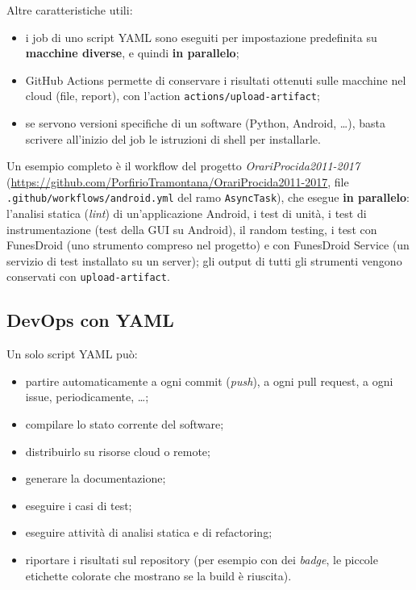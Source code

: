 Altre caratteristiche utili:

\begin{itemize}
  \item i job di uno script YAML sono eseguiti per impostazione predefinita su \textbf{macchine diverse}, e quindi
        \textbf{in parallelo};
  \item GitHub Actions permette di conservare i risultati ottenuti sulle macchine nel cloud (file, report), con
        l'action \texttt{actions/upload-artifact};
  \item se servono versioni specifiche di un software (Python, Android, \ldots), basta scrivere all'inizio del job le
        istruzioni di shell per installarle.
\end{itemize}

Un esempio completo è il workflow del progetto \textit{OrariProcida2011-2017}
(\url{https://github.com/PorfirioTramontana/OrariProcida2011-2017}, file
\texttt{.github/workflows/android.yml} del ramo \texttt{AsyncTask}), che esegue \textbf{in parallelo}: l'analisi
statica (\textit{lint}) di un'applicazione Android, i test di unità, i test di instrumentazione (test della GUI su
Android), il random testing, i test con FunesDroid (uno strumento compreso nel progetto) e con FunesDroid Service (un
servizio di test installato su un server); gli output di tutti gli strumenti vengono conservati con
\texttt{upload-artifact}.

\subsection{DevOps con YAML}

Un solo script YAML può:

\begin{itemize}
  \item partire automaticamente a ogni commit (\textit{push}), a ogni pull request, a ogni issue, periodicamente, \ldots;
  \item compilare lo stato corrente del software;
  \item distribuirlo su risorse cloud o remote;
  \item generare la documentazione;
  \item eseguire i casi di test;
  \item eseguire attività di analisi statica e di refactoring;
  \item riportare i risultati sul repository (per esempio con dei \textit{badge}, le piccole etichette colorate che
        mostrano se la build è riuscita).
\end{itemize}

